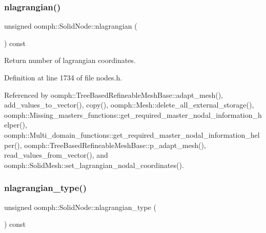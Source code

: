 \mbox{\label{classoomph_1_1SolidNode_af98a0623f9e41a10f48112b9ff7b38a0}} 
\subsubsection{\texorpdfstring{nlagrangian()}{nlagrangian()}}
{\footnotesize\ttfamily unsigned oomph\+::\+Solid\+Node\+::nlagrangian (\begin{DoxyParamCaption}{ }\end{DoxyParamCaption}) const\hspace{0.3cm}{\ttfamily [inline]}}



Return number of lagrangian coordinates. 



Definition at line 1734 of file nodes.\+h.



Referenced by oomph\+::\+Tree\+Based\+Refineable\+Mesh\+Base\+::adapt\+\_\+mesh(), add\+\_\+values\+\_\+to\+\_\+vector(), copy(), oomph\+::\+Mesh\+::delete\+\_\+all\+\_\+external\+\_\+storage(), oomph\+::\+Missing\+\_\+masters\+\_\+functions\+::get\+\_\+required\+\_\+master\+\_\+nodal\+\_\+information\+\_\+helper(), oomph\+::\+Multi\+\_\+domain\+\_\+functions\+::get\+\_\+required\+\_\+master\+\_\+nodal\+\_\+information\+\_\+helper(), oomph\+::\+Tree\+Based\+Refineable\+Mesh\+Base\+::p\+\_\+adapt\+\_\+mesh(), read\+\_\+values\+\_\+from\+\_\+vector(), and oomph\+::\+Solid\+Mesh\+::set\+\_\+lagrangian\+\_\+nodal\+\_\+coordinates().

\mbox{\label{classoomph_1_1SolidNode_a3c1e52e4b6dde53b98228d621f7fcb0a}} 
\subsubsection{\texorpdfstring{nlagrangian\+\_\+type()}{nlagrangian\_type()}}
{\footnotesize\ttfamily unsigned oomph\+::\+Solid\+Node\+::nlagrangian\+\_\+type (\begin{DoxyParamCaption}{ }\end{DoxyParamCaption}) const\hspace{0.3cm}{\ttfamily [inline]}}



